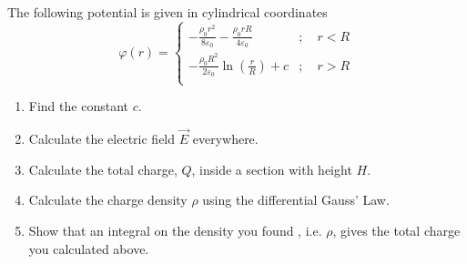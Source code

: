 \documentclass[fleqn, a4paper, 12pt, twoside]{article}
\theoremstyle{definition}
\theoremstyle{theorem}
\begin{document}
\begin{question}
	The following potential is given in cylindrical coordinates
	\begin{equation*}
		\varphi(r) =
			\begin{cases}
				-\frac{\rho_0 r^2}{8 \varepsilon_0} - \frac{\rho_0 r R}{4 \varepsilon_0} & ;\quad r < R \\
				-\frac{\rho_0 R^2}{2 \varepsilon_0} \ln \left( \frac{r}{R} \right) + c   & ;\quad r > R \\
			\end{cases}
	\end{equation*}
	\begin{enumerate}
		\item Find the constant $c$.
		\item Calculate the electric field $\overrightarrow{E}$ everywhere.
		\item Calculate the total charge, $Q$, inside a section with height $H$.
		\item Calculate the charge density $\rho$ using the differential Gauss' Law.
		\item Show that an integral on the density you found , i.e. $\rho$, gives the total charge you calculated above.
	\end{enumerate}
\end{question}
\end{document}
